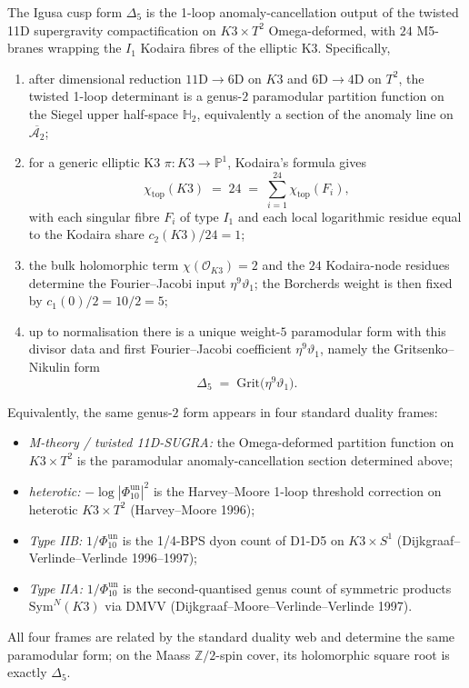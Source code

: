\begin{theorem}
\label{thm:k3-1loop-output}
The Igusa cusp form $\Delta_5$ is the 1-loop anomaly-cancellation output of the
twisted 11D supergravity compactification on $K3\times T^2$ Omega-deformed, with
$24$ M5-branes wrapping the $I_1$ Kodaira fibres of the elliptic K3. Specifically,
\begin{enumerate}[label=\textup{(\arabic*)}]
\item after dimensional reduction $11\mathrm{D}\to 6\mathrm{D}$ on $K3$ and
 $6\mathrm{D}\to 4\mathrm{D}$ on $T^2$, the twisted 1-loop determinant is a
 genus-$2$ paramodular partition function on the Siegel upper half-space
 $\mathbb{H}_2$, equivalently a section of the anomaly line on
 $\overline{\mathcal{A}_2}$;
\item for a generic elliptic K3 $\pi\colon K3\to \mathbb{P}^1$, Kodaira's formula
 gives
 \[
 \chi_{\mathrm{top}}(K3)
 \;=\;
 24
 \;=\;
 \sum_{i=1}^{24}\chi_{\mathrm{top}}(F_i),
 \]
 with each singular fibre $F_i$ of type $I_1$ and each local logarithmic residue
 equal to the Kodaira share $c_2(K3)/24 = 1$;
\item the bulk holomorphic term $\chi(\mathcal{O}_{K3}) = 2$ and the
 $24$ Kodaira-node residues determine the Fourier--Jacobi input
 $\eta^9\vartheta_1$; the Borcherds weight is then fixed by
 $c_1(0)/2=10/2=5$;
\item up to normalisation there is a unique weight-$5$ paramodular form with this
 divisor data and first Fourier--Jacobi coefficient $\eta^9\vartheta_1$, namely
 the Gritsenko--Nikulin form
 \[
 \Delta_5
 \;=\;
 \mathrm{Grit}\bigl(\eta^9\vartheta_1\bigr).
 \]
\end{enumerate}
Equivalently, the same genus-$2$ form appears in four standard duality frames:
\begin{itemize}
\item \emph{M-theory / twisted 11D-SUGRA:} the Omega-deformed partition function on
 $K3\times T^2$ is the paramodular anomaly-cancellation section determined above;
\item \emph{heterotic:} $-\log|\Phi_{10}^{\mathrm{un}}|^2$ is the Harvey--Moore 1-loop threshold
 correction on heterotic $K3\times T^2$ (Harvey--Moore 1996);
\item \emph{Type IIB:} $1/\Phi_{10}^{\mathrm{un}}$ is the 1/4-BPS dyon count of D1-D5 on
 $K3\times S^1$ (Dijkgraaf--Verlinde--Verlinde 1996--1997);
\item \emph{Type IIA:} $1/\Phi_{10}^{\mathrm{un}}$ is the second-quantised genus count of
 symmetric products $\mathrm{Sym}^N(K3)$ via DMVV
 (Dijkgraaf--Moore--Verlinde--Verlinde 1997).
\end{itemize}
All four frames are related by the standard duality web and determine the same
paramodular form; on the Maass $\mathbb{Z}/2$-spin cover, its holomorphic square root
is exactly $\Delta_5$.
\end{theorem}

